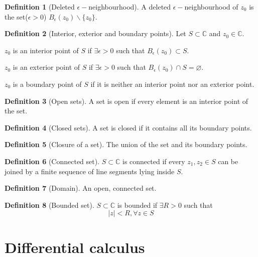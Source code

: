 \documentclass[10pt, a4paper]{extarticle}
\theoremstyle{definition}
\newtheorem{defn}{Definition}
\begin{document}
\begin{defn}[Deleted $\epsilon-$neighbourhood]
	A deleted $\epsilon-$neighbourhood of $z_0$ is the set($\epsilon>0$) $B_\epsilon(z_0)\backslash\{z_0\}$.
\end{defn}

\begin{defn}[Interior, exterior and boundary points]
	Let $S\subset\mathbb{C}$ and $z_0\in\mathbb{C}$.

	$z_0$ is an interior point of $S$ if $\exists \epsilon>0$ such that $B_\epsilon(z_0)\subset S$.

	$z_0$ is an exterior point of $S$ if $\exists \epsilon>0$ such that $B_\epsilon(z_0)\cap S=\varnothing$.

	$z_0$ is a boundary point of $S$ if it is neither an interior point nor an exterior point.
\end{defn}

\begin{defn}[Open sets]
	A set is open if every element is an interior point of the set.
\end{defn}
\begin{defn}[Closed sets]
	A set is closed if it contains all its boundary points.
\end{defn}
\begin{defn}[Closure of a set]\label{closure}
	The union of the set and its boundary points.
\end{defn}
\begin{defn}[Connected set]
	$S\subset\mathbb{C}$ is connected if every $z_1,z_2\in S$ can be joined by a finite sequence of line segments lying inside $S$.
\end{defn}
\begin{defn}[Domain]
	An open, connected set.
\end{defn}
\begin{defn}[Bounded set]
	$S\subset\mathbb{C}$ is bounded if $\exists R>0$ such that\[|z|<R,\forall z\in S\]
\end{defn}

\section{Differential calculus}
\end{document}
